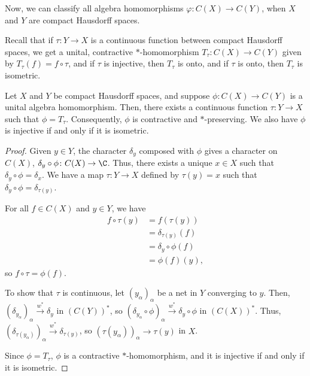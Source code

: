 \documentclass[10pt]{mypackage}
\begin{document}
Now, we can classify all algebra homomorphisms $\varphi\colon C(X)\rightarrow C(Y)$, when $X$ and $Y$ are compact Hausdorff spaces.\newline

Recall that if $\tau\colon Y\rightarrow X$ is a continuous function between compact Hausdorff spaces, we get a unital, contractive $\ast$-homomorphism $T_{\tau}\colon C(X)\rightarrow C(Y)$ given by $T_{\tau}\left(f\right) = f\circ \tau$, and if $\tau$ is injective, then $T_{\tau}$ is onto, and if $\tau$ is onto, then $T_{\tau}$ is isometric.
\begin{proposition}
  Let $X$ and $Y$ be compact Hausdorff spaces, and suppose $\phi\colon C\left(X\right)\rightarrow C\left(Y\right)$ is a unital algebra homomorphism. Then, there exists a continuous function $\tau\colon Y\rightarrow X$ such that $\phi = T_{\tau}$. Consequently, $\phi$ is contractive and $\ast$-preserving. We also have $\phi$ is injective if and only if it is isometric.
\end{proposition}
\begin{proof}
  Given $y\in Y$, the character $\delta_y$ composed with $\phi$ gives a character on $C(X)$, $\delta_y\circ \phi\colon C(X)\rightarrow \C$. Thus, there exists a unique $x\in X$ such that $\delta_y\circ \phi = \delta_x$. We have a map $\tau\colon Y\rightarrow X$ defined by $\tau\left(y\right) = x$ such that $\delta_y\circ \phi = \delta_{\tau(y)}$.\newline

  For all $f\in C(X)$ and $y\in Y$, we have
  \begin{align*}
    f\circ \tau\left(y\right) &= f\left(\tau\left(y\right)\right)\\
                              &= \delta_{\tau\left(y\right)}\left(f\right)\\
                              &= \delta_y\circ \phi\left(f\right)\\
                              &= \phi\left(f\right)\left(y\right),
  \end{align*}
  so $f\circ \tau = \phi\left(f\right)$.\newline

  To show that $\tau$ is continuous, let $\left(y_{\alpha}\right)_{\alpha}$ be a net in $Y$ converging to $y$. Then, $\left(\delta_{y_{\alpha}}\right)_{\alpha}\xrightarrow{w^{\ast}} \delta_y$ in $\left(C\left(Y\right)\right)^{\ast}$, so $\left(\delta_{y_{\alpha}}\circ \phi\right)_{\alpha}\xrightarrow{w^{\ast}}\delta_{y}\circ \phi$ in $\left(C\left(X\right)\right)^{\ast}$. Thus, $\left(\delta_{\tau\left(y_{\alpha}\right)}\right)_{\alpha}\xrightarrow{w^{\ast}}\delta_{\tau\left(y\right)}$, so $\left(\tau\left(y_{\alpha}\right)\right)_{\alpha}\rightarrow \tau\left(y\right)$ in $X$.\newline

  Since $\phi = T_{\tau}$, $\phi$ is a contractive $\ast$-homomorphism, and it is injective if and only if it is isometric.
\end{proof}
\end{document}
